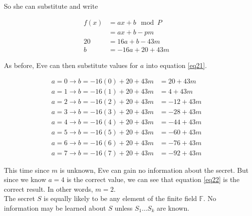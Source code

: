 \documentclass[preview,border=3mm]{article}
\begin{document}
\noindent
So she can substitute and write

\begin{align}
    f(x) &= ax + b \mod P \nonumber \\
         &= ax + b - pm \nonumber \\
      20 &= 16a + b - 43m \nonumber \\
      b  &= -16a + 20 + 43m \label{eq21}
\end{align}

\noindent
As before, Eve can then substitute values for $a$ into equation \ref{eq21}.

\begin{align}
    a = 0 \rightarrow b = -16(0) + 20 + 43m &= 20 + 43m \nonumber \\
    a = 1 \rightarrow b = -16(1) + 20 + 43m &= 4 + 43m \nonumber \\
    a = 2 \rightarrow b = -16(2) + 20 + 43m &= -12 + 43m \nonumber \\
    a = 3 \rightarrow b = -16(3) + 20 + 43m &= -28 + 43m \nonumber \\
    a = 4 \rightarrow b = -16(4) + 20 + 43m &= -44 + 43m \label{eq22} \\
    a = 5 \rightarrow b = -16(5) + 20 + 43m &= -60 + 43m \nonumber \\
    a = 6 \rightarrow b = -16(6) + 20 + 43m &= -76 + 43m \nonumber \\
    a = 7 \rightarrow b = -16(7) + 20 + 43m &= -92 + 43m \nonumber
\end{align}

\noindent
This time since $m$ is unknown, Eve can gain no information about the secret.
But since we know $a = 4$ is the correct value, we can see that equation
\ref{eq22} is the correct result. In other words, $m = 2$. \\

\noindent
The secret $S$ is equally likely to be any element of the finite field
$\mathbb{F}$. No information may be learned about $S$ unless $S_1 \ldots S_k$
are known.
\end{document}

